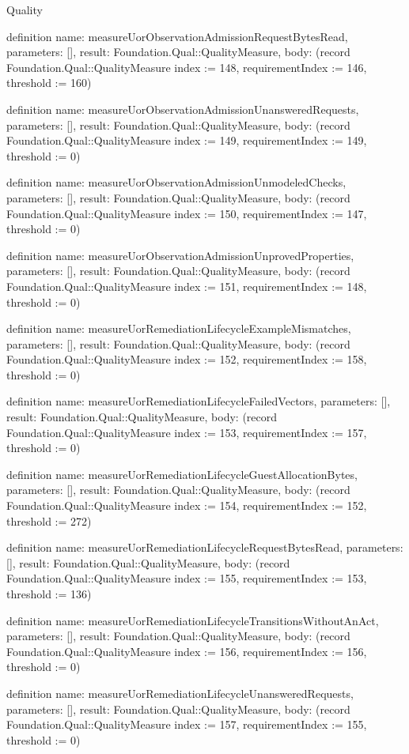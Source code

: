 \begin{lexlean}{Quality}
\begin{semanticmodule}
definition{
  name: measureUorObservationAdmissionRequestBytesRead,
  parameters: [],
  result: Foundation.Qual::QualityMeasure,
  body: (record Foundation.Qual::QualityMeasure {index := 148, requirementIndex := 146, threshold := 160})
}

definition{
  name: measureUorObservationAdmissionUnansweredRequests,
  parameters: [],
  result: Foundation.Qual::QualityMeasure,
  body: (record Foundation.Qual::QualityMeasure {index := 149, requirementIndex := 149, threshold := 0})
}

definition{
  name: measureUorObservationAdmissionUnmodeledChecks,
  parameters: [],
  result: Foundation.Qual::QualityMeasure,
  body: (record Foundation.Qual::QualityMeasure {index := 150, requirementIndex := 147, threshold := 0})
}

definition{
  name: measureUorObservationAdmissionUnprovedProperties,
  parameters: [],
  result: Foundation.Qual::QualityMeasure,
  body: (record Foundation.Qual::QualityMeasure {index := 151, requirementIndex := 148, threshold := 0})
}

definition{
  name: measureUorRemediationLifecycleExampleMismatches,
  parameters: [],
  result: Foundation.Qual::QualityMeasure,
  body: (record Foundation.Qual::QualityMeasure {index := 152, requirementIndex := 158, threshold := 0})
}

definition{
  name: measureUorRemediationLifecycleFailedVectors,
  parameters: [],
  result: Foundation.Qual::QualityMeasure,
  body: (record Foundation.Qual::QualityMeasure {index := 153, requirementIndex := 157, threshold := 0})
}

definition{
  name: measureUorRemediationLifecycleGuestAllocationBytes,
  parameters: [],
  result: Foundation.Qual::QualityMeasure,
  body: (record Foundation.Qual::QualityMeasure {index := 154, requirementIndex := 152, threshold := 272})
}

definition{
  name: measureUorRemediationLifecycleRequestBytesRead,
  parameters: [],
  result: Foundation.Qual::QualityMeasure,
  body: (record Foundation.Qual::QualityMeasure {index := 155, requirementIndex := 153, threshold := 136})
}

definition{
  name: measureUorRemediationLifecycleTransitionsWithoutAnAct,
  parameters: [],
  result: Foundation.Qual::QualityMeasure,
  body: (record Foundation.Qual::QualityMeasure {index := 156, requirementIndex := 156, threshold := 0})
}

definition{
  name: measureUorRemediationLifecycleUnansweredRequests,
  parameters: [],
  result: Foundation.Qual::QualityMeasure,
  body: (record Foundation.Qual::QualityMeasure {index := 157, requirementIndex := 155, threshold := 0})
}


\end{semanticmodule}
\end{lexlean}
